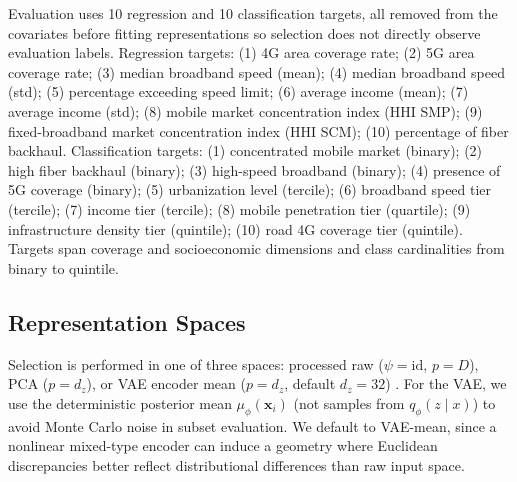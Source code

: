\documentclass[10pt,journal]{IEEEtran}
\newcommand{\latentDim}{d_z}
\newcommand{\1}{\mathbf{1}}
\newcommand{\bx}{\mathbf{x}}
\theoremstyle{ieeethm}
\begin{document}
Evaluation uses 10 regression and 10 classification targets, all removed from the covariates before fitting representations so selection does not directly observe evaluation labels. Regression targets: (1) 4G area coverage rate; (2) 5G area coverage rate; (3) median broadband speed (mean); (4) median broadband speed (std); (5) percentage exceeding speed limit; (6) average income (mean); (7) average income (std); (8) mobile market concentration index (HHI SMP); (9) fixed-broadband market concentration index (HHI SCM); (10) percentage of fiber backhaul. Classification targets: (1) concentrated mobile market (binary); (2) high fiber backhaul (binary); (3) high-speed broadband (binary); (4) presence of 5G coverage (binary); (5) urbanization level (tercile); (6) broadband speed tier (tercile); (7) income tier (tercile); (8) mobile penetration tier (quartile); (9) infrastructure density tier (quintile); (10) road 4G coverage tier (quintile). Targets span coverage and socioeconomic dimensions and class cardinalities from binary to quintile.

\subsection{Representation Spaces}
\label{subsec:repr}

Selection is performed in one of three spaces: processed raw ($\psi=\mathrm{id}$, $p=D$), PCA ($p=\latentDim$), or VAE encoder mean ($p=\latentDim$, default $\latentDim=32$) \cite{kingma2014autoencoding}. For the VAE, we use the deterministic posterior mean $\mu_\phi(\bx_i)$ (not samples from $q_\phi(z\mid x)$) to avoid Monte Carlo noise in subset evaluation. We default to VAE-mean, since a nonlinear mixed-type encoder can induce a geometry where Euclidean discrepancies better reflect distributional differences than raw input space.
\end{document}
